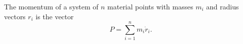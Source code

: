 The momentum of a system of $n$ material points with masses $m_i$ and radius vectors $r_i$ is the vector
$$P = \sum_{i=1}^{n} m_i \dot{r}_i.$$
